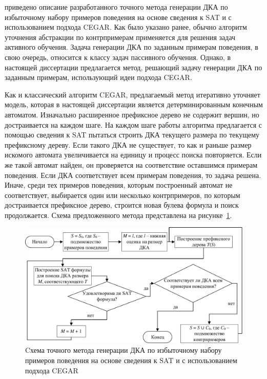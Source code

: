 \insection{\ref{sec:cegar:cegar-algo}} приведено описание разработанного точного метода генерации ДКА по избыточному набору примеров поведения на основе сведения к SAT и с использованием подхода CEGAR. 
Как было указано ранее, обычно алгоритм уточнения абстракции по контрпримерам применяется для решения задач активного обучения. 
Задача генерации ДКА по заданным примерам поведения, в свою очередь, относится к классу задач пассивного обучения.
Однако, в настоящей диссертации предлагается метод, решающий задачу генерации ДКА по заданным примерам, использующий идеи подхода CEGAR.

Как и классический алгоритм CEGAR, предлагаемый метод итеративно уточняет модель, которая в настоящей диссертации является детерминированным конечным автоматом.
Изначально расширенное префиксное дерево не содержит вершин, но достраивается на каждом шаге.
На каждом шаге работы алгоритма предлагается с помощью сведения к SAT пытаться строить ДКА текущего размера по текущему префиксному дереву.
Если такого ДКА не существует, то как и раньше размер искомого автомата увеличивается на единицу и процесс поиска повторяется.
Если же такой автомат найден, он проверяется на соответствие оставшимся примерам поведения.
Если ДКА соответствует всем примерам поведения, то задача решена.
Иначе, среди тех примеров поведения, которым построенный автомат не соответствует, выбирается один или несколько контрпримеров, по которым достраивается префиксное дерево, строится новая булева формула и поиск продолжается.
Схема предложенного метода представлена на рисунке~\ref{syn:img:cegar-algo}.

\begin{figure}[ht]
  \centering
  \includegraphics[scale=0.85]{img/ntv/cegar.pdf}
  \caption{Cхема точного метода генерации ДКА по избыточному набору примеров поведения на основе сведения к SAT и с использованием подхода CEGAR}
  \label{syn:img:cegar-algo}
\end{figure}

